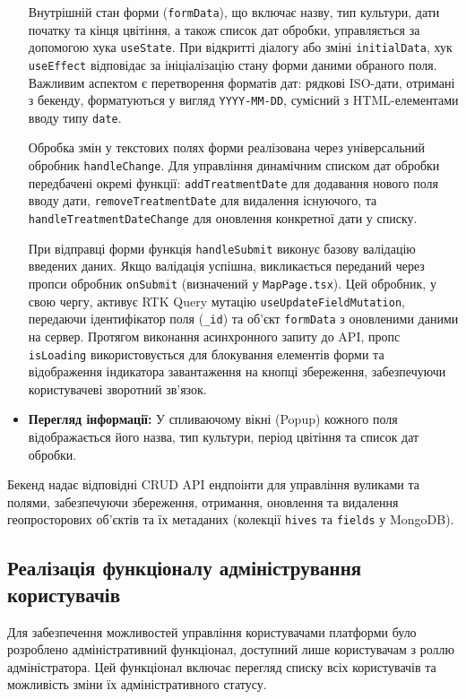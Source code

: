 \begin{itemize}
    Внутрішній стан форми (\texttt{formData}), що включає назву, тип культури, дати початку та кінця цвітіння, а також список дат обробки, управляється за допомогою хука \texttt{useState}. При відкритті діалогу або зміні \texttt{initialData}, хук \texttt{useEffect} відповідає за ініціалізацію стану форми даними обраного поля. Важливим аспектом є перетворення форматів дат: рядкові ISO-дати, отримані з бекенду, форматуються у вигляд \texttt{YYYY-MM-DD}, сумісний з HTML-елементами вводу типу \texttt{date}.
    
    Обробка змін у текстових полях форми реалізована через універсальний обробник \texttt{handleChange}. Для управління динамічним списком дат обробки передбачені окремі функції: \texttt{addTreatmentDate} для додавання нового поля вводу дати, \texttt{removeTreatmentDate} для видалення існуючого, та \texttt{handleTreatmentDateChange} для оновлення конкретної дати у списку. 
    
    При відправці форми функція \texttt{handleSubmit} виконує базову валідацію введених даних. Якщо валідація успішна, викликається переданий через пропси обробник \texttt{onSubmit} (визначений у \texttt{MapPage.tsx}). Цей обробник, у свою чергу, активує RTK Query мутацію \texttt{useUpdateFieldMutation}, передаючи ідентифікатор поля (\texttt{\_id}) та об'єкт \texttt{formData} з оновленими даними на сервер. Протягом виконання асинхронного запиту до API, пропс \texttt{isLoading} використовується для блокування елементів форми та відображення індикатора завантаження на кнопці збереження, забезпечуючи користувачеві зворотний зв'язок.

    \item \textbf{Перегляд інформації:} У спливаючому вікні (Popup) кожного поля відображається його назва, тип культури, період цвітіння та список дат обробки.
\end{itemize}

Бекенд надає відповідні CRUD API ендпоінти для управління вуликами та полями, забезпечуючи збереження, отримання, оновлення та видалення геопросторових об'єктів та їх метаданих (колекції \texttt{hives} та \texttt{fields} у MongoDB).

\subsection{Реалізація функціоналу адміністрування користувачів}
\label{subsec:admin_user_management}
Для забезпечення можливостей управління користувачами платформи було розроблено адміністративний функціонал, доступний лише користувачам з роллю адміністратора. Цей функціонал включає перегляд списку всіх користувачів та можливість зміни їх адміністративного статусу.

